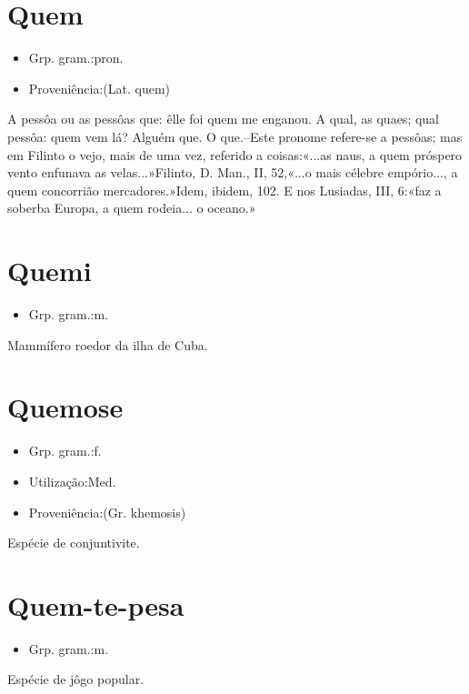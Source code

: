 \section{Quem}
\begin{itemize}
\item {Grp. gram.:pron.}
\end{itemize}
\begin{itemize}
\item {Proveniência:(Lat. \textunderscore quem\textunderscore )}
\end{itemize}
A pessôa ou as pessôas que: \textunderscore êlle foi quem me enganou\textunderscore .
A qual, as quaes; qual pessôa: \textunderscore quem vem lá\textunderscore ?
Alguém que.
O que.--Este pronome refere-se a pessôas; mas em Filinto o vejo, mais de uma vez, referido a coisas:«\textunderscore ...as naus, a quem próspero vento enfunava as velas...\textunderscore »Filinto, \textunderscore D. Man.\textunderscore , II, 52,«\textunderscore ...o mais célebre empório..., a quem concorrião mercadores.\textunderscore »\textunderscore Idem\textunderscore , \textunderscore ibidem\textunderscore , 102. E nos \textunderscore Lusiadas\textunderscore , III, 6:«\textunderscore faz a soberba Europa, a quem rodeia... o oceano.\textunderscore »
\section{Quemi}
\begin{itemize}
\item {Grp. gram.:m.}
\end{itemize}
Mammífero roedor da ilha de Cuba.
\section{Quemose}
\begin{itemize}
\item {Grp. gram.:f.}
\end{itemize}
\begin{itemize}
\item {Utilização:Med.}
\end{itemize}
\begin{itemize}
\item {Proveniência:(Gr. \textunderscore khemosis\textunderscore )}
\end{itemize}
Espécie de conjuntivite.
\section{Quem-te-pesa}
\begin{itemize}
\item {Grp. gram.:m.}
\end{itemize}
Espécie de jôgo popular.
